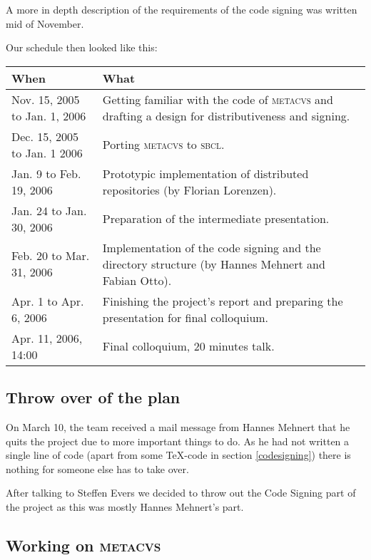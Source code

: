 \documentclass[fleqn, 10pt, a4paper]{report} \usepackage{amssymb}
\begin{document}
A more in depth description of the requirements of the code signing
was written mid of November.

Our schedule then looked like this: \bigskip

\begin{center}
  \begin{tabular}{|p{}|p{}|}
    \hline
    \textmd{When} & \textmd{What} \\
    \hline\hline
    Nov. 15, 2005 to Jan. 1, 2006 &
    Getting familiar with the code of \textsc{metacvs}
    and drafting a design for distributiveness and signing. \\
    \hline
    Dec. 15, 2005 to Jan. 1 2006 &
    Porting \textsc{metacvs} to \textsc{sbcl}. \\
    \hline
    Jan. 9 to Feb. 19, 2006 & Prototypic implementation of
    distributed repositories (by Florian Lorenzen). \\
    \hline
    Jan. 24 to Jan. 30, 2006 & Preparation of the intermediate
    presentation. \\
    \hline
    Feb. 20 to Mar. 31, 2006 & Implementation of the code signing
    and the directory structure (by Hannes Mehnert and Fabian Otto). \\
    \hline
    Apr. 1 to Apr. 6, 2006 & Finishing the project's report
    and preparing the presentation for final colloquium. \\
    \hline
    Apr. 11, 2006, 14:00 & Final colloquium, 20 minutes talk. \\
    \hline
  \end{tabular}
\end{center}

\subsection{Throw over of the plan}

On March 10, the team received a mail message from Hannes Mehnert that he
quits the project due to more important things to do. As he had not written
a single line of code (apart from some \TeX-code in section \ref{codesigning})
there is nothing for someone else has to take over.

After talking to Steffen Evers we decided to throw out the Code Signing
part of the project as this was mostly Hannes Mehnert's part.

\subsection{Working on \textsc{metacvs}}
\end{document}
